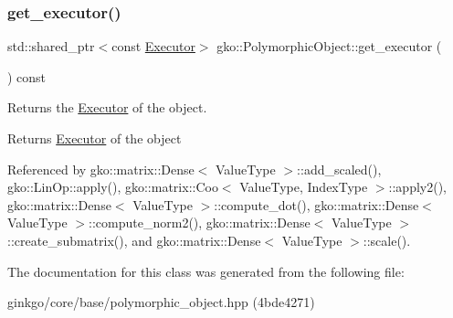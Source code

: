 \subsubsection{\texorpdfstring{get\+\_\+executor()}{get\_executor()}}
{\footnotesize\ttfamily std\+::shared\+\_\+ptr$<$const \hyperlink{classgko_1_1Executor}{Executor}$>$ gko\+::\+Polymorphic\+Object\+::get\+\_\+executor (\begin{DoxyParamCaption}{ }\end{DoxyParamCaption}) const\hspace{0.3cm}{\ttfamily [noexcept]}}



Returns the \hyperlink{classgko_1_1Executor}{Executor} of the object. 

\begin{DoxyReturn}{Returns}
\hyperlink{classgko_1_1Executor}{Executor} of the object 
\end{DoxyReturn}


Referenced by gko\+::matrix\+::\+Dense$<$ Value\+Type $>$\+::add\+\_\+scaled(), gko\+::\+Lin\+Op\+::apply(), gko\+::matrix\+::\+Coo$<$ Value\+Type, Index\+Type $>$\+::apply2(), gko\+::matrix\+::\+Dense$<$ Value\+Type $>$\+::compute\+\_\+dot(), gko\+::matrix\+::\+Dense$<$ Value\+Type $>$\+::compute\+\_\+norm2(), gko\+::matrix\+::\+Dense$<$ Value\+Type $>$\+::create\+\_\+submatrix(), and gko\+::matrix\+::\+Dense$<$ Value\+Type $>$\+::scale().



The documentation for this class was generated from the following file\+:\begin{DoxyCompactItemize}
\item 
ginkgo/core/base/polymorphic\+\_\+object.\+hpp (4bde4271)\end{DoxyCompactItemize}
